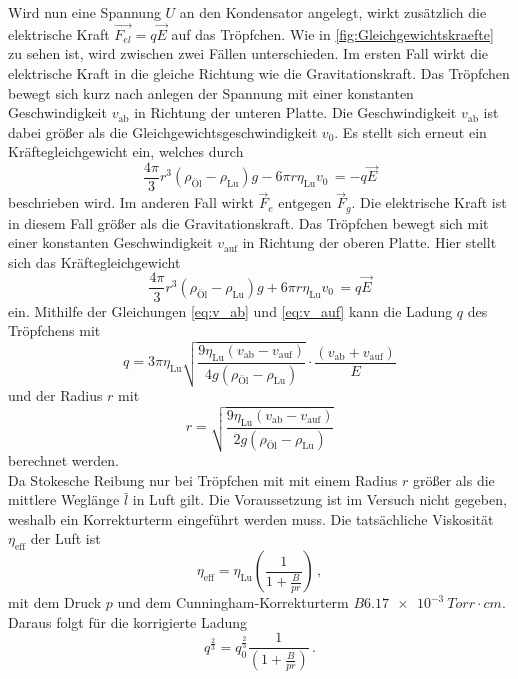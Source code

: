 Wird nun eine Spannung $U$ an den Kondensator angelegt, wirkt zusätzlich die elektrische Kraft $\vec{F_{el}} = q \vec{E}$ auf das Tröpfchen.
Wie in \autoref{fig:Gleichgewichtskraefte} zu sehen ist, wird zwischen zwei Fällen unterschieden.
Im ersten Fall wirkt die elektrische Kraft in die gleiche Richtung wie die Gravitationskraft.
Das Tröpfchen bewegt sich kurz nach anlegen der Spannung mit einer konstanten Geschwindigkeit $v_{\text{ab}}$ in Richtung der unteren Platte.
Die Geschwindigkeit $v_{\text{ab}}$ ist dabei größer als die Gleichgewichtsgeschwindigkeit $v_0$.
Es stellt sich erneut ein Kräftegleichgewicht ein, welches durch
\begin{equation}\label{eq:v_ab}
    \frac{4 \pi}{3}r^3 \left(\rho_{\text{Öl}} - \rho_{\text{Lu}}\right) g - 6 \pi r \eta_{\text{Lu}} v_0 \, = -q\vec{E}
\end{equation} 
beschrieben wird.
Im anderen Fall wirkt $\vec{F}_e$ entgegen $\vec{F}_g$.
Die elektrische Kraft ist in diesem Fall größer als die Gravitationskraft.
Das Tröpfchen bewegt sich mit einer konstanten Geschwindigkeit $v_{\text{auf}}$ in Richtung der oberen Platte.
Hier stellt sich das Kräftegleichgewicht
\begin{equation}\label{eq:v_auf}
    \frac{4 \pi}{3}r^3 \left(\rho_{\text{Öl}} - \rho_{\text{Lu}}\right) g + 6 \pi r \eta_{\text{Lu}} v_0 \, = q\vec{E}
\end{equation}
ein.
Mithilfe der Gleichungen \eqref{eq:v_ab} und \eqref{eq:v_auf} kann die Ladung $q$ des Tröpfchens mit
\begin{equation}\label{eq:ladung}
    q = 3 \pi \eta_{\text{Lu}} \sqrt{\frac{9 \eta_{\text{Lu}} (v_{\text{ab}} - v_{\text{auf}})}{4 g \left(\rho_{\text{Öl}} - \rho_{\text{Lu}}\right)}} \cdot \frac{\left(v_{\text{ab}} + v_{\text{auf}}\right)}{E}
\end{equation}
und der Radius $r$ mit
\begin{equation}\label{eq:radius}
    r = \sqrt{\frac{9 \eta_{\text{Lu}} (v_{\text{ab}} - v_{\text{auf}})}{2 g \left(\rho_{\text{Öl}} - \rho_{\text{Lu}}\right)}}
\end{equation}
berechnet werden.\\
Da Stokesche Reibung nur bei Tröpfchen mit mit einem Radius $r$ größer als die mittlere Weglänge $\bar{l}$ in Luft gilt.
Die Voraussetzung ist im Versuch nicht gegeben, weshalb ein Korrekturterm eingeführt werden muss.
Die tatsächliche Viskosität $\eta_{\text{eff}}$ der Luft ist
\begin{equation*}
    \eta_{\text{eff}} = \eta_{\text{Lu}} \left(\frac{1}{1 + \frac{B}{pr}}\right) \, ,
\end{equation*}
mit dem Druck $p$ und dem Cunningham-Korrekturterm $B \SI{6.17e-3}{Torr\cdot cm}$.
Daraus folgt für die korrigierte Ladung
\begin{equation}\label{eq:korrigierte_ladung}
    q^{\frac{2}{3}} = q_0^{\frac{2}{3}} \frac{1}{\left(1 + \frac{B}{pr}\right)} \, .
\end{equation}

\newpage